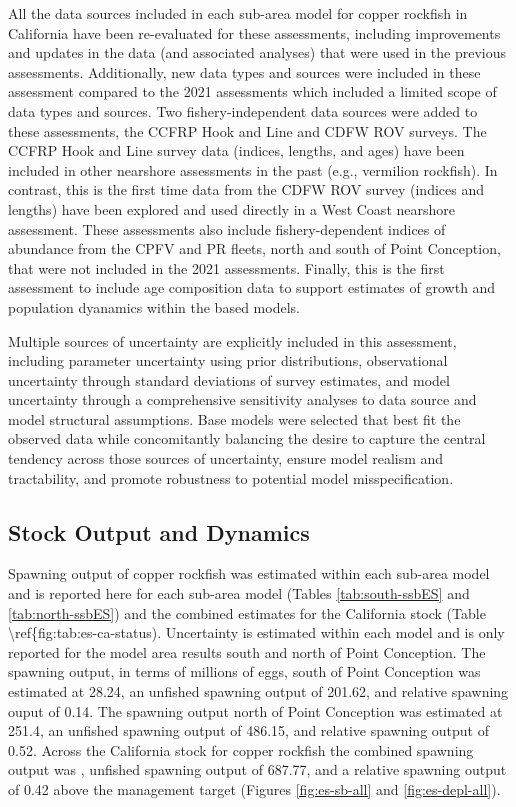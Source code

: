 \documentclass[11pt,
  english,
  letterpaper,
]{article}
\begin{document}
All the data sources included in each sub-area model for copper rockfish in California have been re-evaluated for these assessments, including improvements and updates in the data (and associated analyses) that were used in the previous assessments. Additionally, new data types and sources were included in these assessment compared to the 2021 assessments which included a limited scope of data types and sources. Two fishery-independent data sources were added to these assessments, the CCFRP Hook and Line and CDFW ROV surveys. The CCFRP Hook and Line survey data (indices, lengths, and ages) have been included in other nearshore assessments in the past (e.g., vermilion rockfish). In contrast, this is the first time data from the CDFW ROV survey (indices and lengths) have been explored and used directly in a West Coast nearshore assessment. These assessments also include fishery-dependent indices of abundance from the CPFV and PR fleets, north and south of Point Conception, that were not included in the 2021 assessments. Finally, this is the first assessment to include age composition data to support estimates of growth and population dyanamics within the based models.

Multiple sources of uncertainty are explicitly included in this assessment, including parameter uncertainty using prior distributions, observational uncertainty through standard deviations of survey estimates, and model uncertainty through a comprehensive sensitivity analyses to data source and model structural assumptions. Base models were selected that best fit the observed data while concomitantly balancing the desire to capture the central tendency across those sources of uncertainty, ensure model realism and tractability, and promote robustness to potential model misspecification.

\hypertarget{stock-output-and-dynamics}{%
\subsection*{Stock Output and Dynamics}\label{stock-output-and-dynamics}}

Spawning output of copper rockfish was estimated within each sub-area model and is reported here for each sub-area model (Tables \ref{tab:south-ssbES} and \ref{tab:north-ssbES}) and the combined estimates for the California stock (Table \textbackslash ref\{fig:tab:es-ca-status). Uncertainty is estimated within each model and is only reported for the model area results south and north of Point Conception. The spawning output, in terms of millions of eggs, south of Point Conception was estimated at 28.24, an unfished spawning output of 201.62, and relative spawning ouput of 0.14. The spawning output north of Point Conception was estimated at 251.4, an unfished spawning output of 486.15, and relative spawning output of 0.52. Across the California stock for copper rockfish the combined spawning output was , unfished spawning output of 687.77, and a relative spawning output of 0.42 above the management target (Figures \ref{fig:es-sb-all} and \ref{fig:es-depl-all}).
\end{document}
